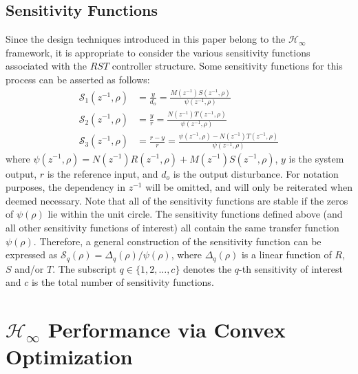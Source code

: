 \documentclass[journal]{IEEEtran}
\begin{document}
\subsection{Sensitivity Functions}
\label{sec:23}
Since the design techniques introduced in this paper belong to the $\mathcal{H}_{\infty}$ framework, it is  appropriate to consider the various sensitivity functions associated with the $RST$ controller structure. Some sensitivity functions for this process can be asserted as follows:
\begin{align}
\mathcal{S}_1(z^{-1},\rho)&= \frac{y}{d_o} = \frac{M(z^{-1})S(z^{-1},\rho)}{\psi(z^{-1},\rho)}  \label{eq:S0}\\
\mathcal{S}_2(z^{-1},\rho)&= \frac{y}{r} =\frac{N(z^{-1})T(z^{-1},\rho)}{\psi(z^{-1},\rho)} \label{eq:T} \\
\mathcal{S}_3(z^{-1},\rho)&= \frac{r-y}{r} =\frac{\psi(z^{-1},\rho)-N(z^{-1})T(z^{-1},\rho)}{\psi(z^{-1},\rho)} 
\end{align}
where $\psi(z^{-1},\rho) = N(z^{-1})R(z^{-1},\rho)+M(z^{-1})S(z^{-1},\rho)$, $y$ is the system output, $r$ is the reference input, and $d_o$ is the output disturbance. For notation purposes, the dependency in $z^{-1}$ will be omitted, and will only be reiterated when deemed necessary. Note that all of the sensitivity functions are stable if the zeros of $\psi(\rho)$ lie within the unit circle. The sensitivity functions defined above (and all other sensitivity functions of interest) all contain the same transfer function  $\psi(\rho)$. Therefore, a general construction of the sensitivity function can be expressed as $\mathcal{S}_q(\rho) = \Delta_q(\rho)/ \psi(\rho)$, where $\Delta_q(\rho)$ is a linear function of $R$, $S$ and/or $T$. The subscript $q \in \{ 1,2,\ldots,c\}$ denotes the $q$-th sensitivity of interest and $c$ is the total number of sensitivity functions. 




\section{$\mathcal{H}_{\infty}$ Performance via Convex Optimization}
\label{sec:3}
\end{document}
